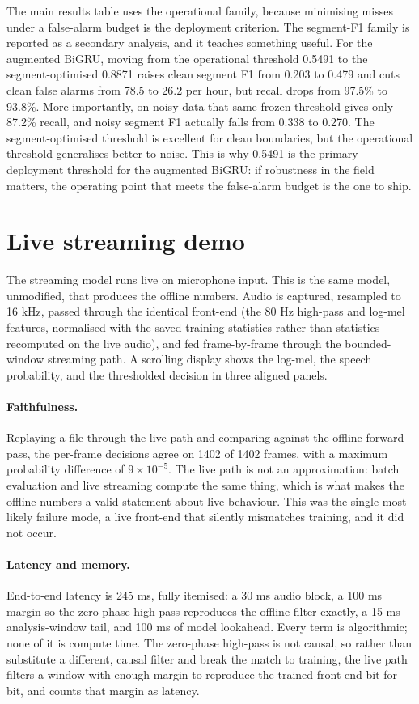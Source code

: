\documentclass{article}
\begin{document}
The main results table uses the operational family, because minimising misses under a false-alarm budget is the deployment criterion. The segment-F1 family is reported as a secondary analysis, and it teaches something useful. For the augmented BiGRU, moving from the operational threshold 0.5491 to the segment-optimised 0.8871 raises clean segment F1 from 0.203 to 0.479 and cuts clean false alarms from 78.5 to 26.2 per hour, but recall drops from 97.5\% to 93.8\%. More importantly, on noisy data that same frozen threshold gives only 87.2\% recall, and noisy segment F1 actually falls from 0.338 to 0.270. The segment-optimised threshold is excellent for clean boundaries, but the operational threshold generalises better to noise. This is why 0.5491 is the primary deployment threshold for the augmented BiGRU: if robustness in the field matters, the operating point that meets the false-alarm budget is the one to ship.

\section{Live streaming demo}
\label{sec:live}

The streaming model runs live on microphone input. This is the same model, unmodified, that produces the offline numbers. Audio is captured, resampled to 16 kHz, passed through the identical front-end (the 80 Hz high-pass and log-mel features, normalised with the saved training statistics rather than statistics recomputed on the live audio), and fed frame-by-frame through the bounded-window streaming path. A scrolling display shows the log-mel, the speech probability, and the thresholded decision in three aligned panels.

\paragraph{Faithfulness.} Replaying a file through the live path and comparing against the offline forward pass, the per-frame decisions agree on 1402 of 1402 frames, with a maximum probability difference of $9\times10^{-5}$. The live path is not an approximation: batch evaluation and live streaming compute the same thing, which is what makes the offline numbers a valid statement about live behaviour. This was the single most likely failure mode, a live front-end that silently mismatches training, and it did not occur.

\paragraph{Latency and memory.} End-to-end latency is 245 ms, fully itemised: a
30 ms audio block, a 100 ms margin so the zero-phase high-pass reproduces the
offline filter exactly, a 15 ms analysis-window tail, and 100 ms of model
lookahead. Every term is algorithmic; none of it is compute time. The zero-phase
high-pass is not causal, so rather than substitute a different, causal filter and
break the match to training, the live path filters a window with enough margin to
reproduce the trained front-end bit-for-bit, and counts that margin as latency.
\end{document}
